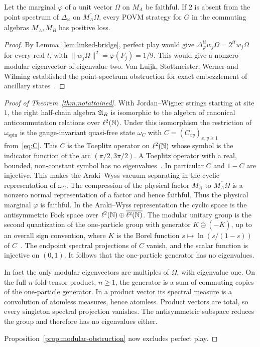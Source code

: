 \begin{proposition}\label{prop:modular-obstruction}
Let the marginal $\varphi$ of a unit vector $\Omega$ on $M_A$ be faithful. If
$2$ is absent from the point spectrum of $\Delta_\varphi$ on $\overline{M_A\Omega}$,
every POVM strategy for $G$ in the commuting algebras $M_A,M_B$ has positive loss.
\end{proposition}
\begin{proof}
By Lemma~\ref{lem:linked-bridge}, perfect play would give
$\Delta_\varphi^{it}w_j\Omega=2^{it}w_j\Omega$ for every real $t$, with
$\|w_j\Omega\|^2=\varphi(F_j)=1/9$. This would give a nonzero modular eigenvector
of eigenvalue two. Van Luijk, Stottmeister, Werner and Wilming established the
point-spectrum obstruction for exact embezzlement of ancillary
states~\cite[Proposition~35 and Corollary~36]{vLSWW24}.
\end{proof}
\begin{proof}[Proof of Theorem~\ref{thm:notattained}]
With Jordan--Wigner strings starting at site $1$, the right half-chain algebra $\mathfrak{A}_R$ is
isomorphic to the algebra of canonical anticommutation relations over $\ell^2(\mathbb{N})$. Under this
isomorphism the restriction of $\omega_{\mathrm{spin}}$ is the gauge-invariant quasi-free state
$\omega_C$ with $C=(C_{xy})_{x,y\ge1}$ from~\eqref{eq:C}. This $C$ is the Toeplitz operator on
$\ell^2(\mathbb{N})$ whose symbol is the indicator
function of the arc $(\pi/2,3\pi/2)$. A Toeplitz operator with a real, bounded, non-constant
symbol has no eigenvalues~\cite{HartmanWintner54}. In particular $C$ and $1-C$ are injective.
This makes the Araki--Wyss vacuum separating in the cyclic representation of $\omega_C$.
The compression of the physical factor $M_A$ to $\overline{M_A\Omega}$ is a nonzero normal
representation of a factor and hence faithful. Thus the physical marginal $\varphi$ is faithful.
In the Araki--Wyss representation the cyclic space is the antisymmetric Fock space over
$\ell^2(\mathbb{N})\oplus\overline{\ell^2(\mathbb{N})}$. The modular unitary group is the second quantization of
the one-particle group with generator $K\oplus(-\overline K)$, up to an overall sign convention,
where $K$ is the Borel function $s\mapsto\ln(s/(1-s))$ of
$C$~\cite{ArakiWyss64,PowersStormer70,Araki71,BR2}. The endpoint spectral projections of $C$
vanish, and the scalar function is injective on $(0,1)$. It follows that the one-particle
generator has no eigenvalues.

In fact the only modular eigenvectors are multiples of $\Omega$, with eigenvalue one. On the full $n$-fold tensor product, $n\ge1$, the generator is a sum of
commuting copies of the one-particle generator. In a product vector its
spectral measure is a convolution of atomless measures, hence atomless.
Product vectors are total, so every singleton spectral projection vanishes.
The antisymmetric subspace reduces the group and therefore has no
eigenvalues either.

Proposition~\ref{prop:modular-obstruction} now excludes perfect play.
\end{proof}
